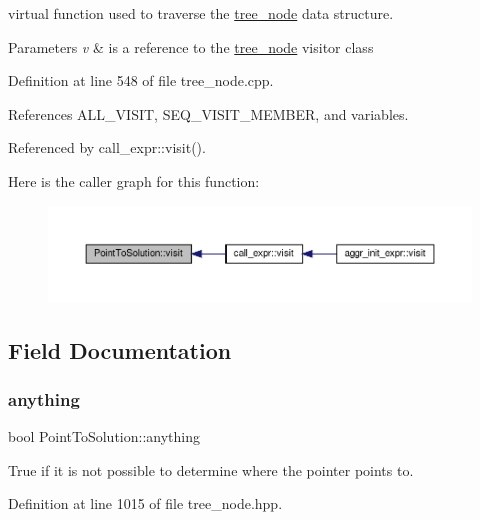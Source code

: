 virtual function used to traverse the \hyperlink{classtree__node}{tree\+\_\+node} data structure. 


\begin{DoxyParams}{Parameters}
{\em v} & is a reference to the \hyperlink{classtree__node}{tree\+\_\+node} visitor class \\
\hline
\end{DoxyParams}


Definition at line 548 of file tree\+\_\+node.\+cpp.



References A\+L\+L\+\_\+\+V\+I\+S\+IT, S\+E\+Q\+\_\+\+V\+I\+S\+I\+T\+\_\+\+M\+E\+M\+B\+ER, and variables.



Referenced by call\+\_\+expr\+::visit().

Here is the caller graph for this function\+:
\nopagebreak
\begin{figure}[H]
\begin{center}
\leavevmode
\includegraphics[width=350pt]{d8/dfc/structPointToSolution_afc598575443b8e2e105d17ea84d0de01_icgraph}
\end{center}
\end{figure}


\subsection{Field Documentation}
\mbox{\label{structPointToSolution_a15fcaeedd444097570de463deb616ec4}} 
\subsubsection{\texorpdfstring{anything}{anything}}
{\footnotesize\ttfamily bool Point\+To\+Solution\+::anything}



True if it is not possible to determine where the pointer points to. 



Definition at line 1015 of file tree\+\_\+node.\+hpp.



